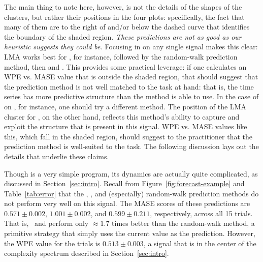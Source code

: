 The main thing to note here, however, is not the details of the shapes
of the clusters, but rather their positions in the four plots:
specifically, the fact that many of them are to the right of and/or
below the dashed curve that identifies the boundary of the shaded
region.  \emph{These predictions are not as good as our heuristic
  suggests they could be.}  Focusing in on any single signal makes
this clear: LMA works best for \svdsix, for instance, followed by the
random-walk prediction method, then \arima and \naive.  This provides
some practical leverage: if one calculates an WPE vs. MASE value that
is outside the shaded region, that should suggest that the prediction
method is not well matched to the task at hand: that is, the time
series has more predictive structure than the method is able to use.
%
%
In the case of \arima on \svdsix, for instance, one should try a
different method.  The position of the LMA cluster for \svdsix, on the
other hand, reflects this method's ability to capture and exploit the
structure that is present in this signal.  WPE vs. MASE values like
this, which fall in the shaded region, should suggest to the
practitioner that the prediction method is well-suited to the task.
The following discussion lays out the details that underlie these
claims.
%
%

Though \col is a very simple program, its dynamics are actually quite
complicated, as discussed in Section~\ref{sec:intro}.  Recall from
Figure~\ref{fig:forecast-example} and Table~\ref{tab:error} that the
\naive, \arima, and (especially) random-walk prediction methods do not
perform very well on this signal.  The MASE scores of these
predictions are $0.571 \pm 0.002$, $1.001 \pm 0.002$, and $0.599 \pm
0.211$, respectively, across all 15 trials.  That is, \naive ~and
\arima perform only $\approx 1.7$ times better than the random-walk
method, a primitive strategy that simply uses the current value as the
prediction.  However, the WPE value for the \col trials is $0.513 \pm
0.003$, a signal that is in the center of the complexity spectrum
described in Section~\ref{sec:intro}.


